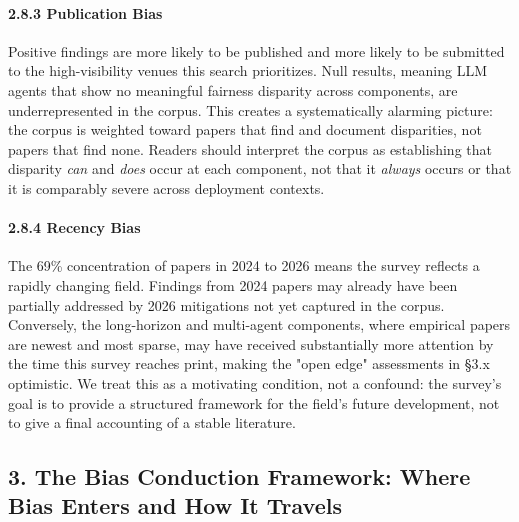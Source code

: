 \documentclass[10pt]{article}
\begin{document}
\paragraph*{2.8.3 Publication Bias}

Positive findings are more likely to be published and more likely to be submitted to the high-visibility venues this search prioritizes. Null results, meaning LLM agents that show no meaningful fairness disparity across components, are underrepresented in the corpus. This creates a systematically alarming picture: the corpus is weighted toward papers that find and document disparities, not papers that find none. Readers should interpret the corpus as establishing that disparity \emph{can} and \emph{does} occur at each component, not that it \emph{always} occurs or that it is comparably severe across deployment contexts.

\paragraph*{2.8.4 Recency Bias}

The 69\% concentration of papers in 2024 to 2026 means the survey reflects a rapidly changing field. Findings from 2024 papers may already have been partially addressed by 2026 mitigations not yet captured in the corpus. Conversely, the long-horizon and multi-agent components, where empirical papers are newest and most sparse, may have received substantially more attention by the time this survey reaches print, making the "open edge" assessments in \S{}3.x optimistic. We treat this as a motivating condition, not a confound: the survey's goal is to provide a structured framework for the field's future development, not to give a final accounting of a stable literature.



\subsection*{3. The Bias Conduction Framework: Where Bias Enters and How It Travels}
\end{document}
